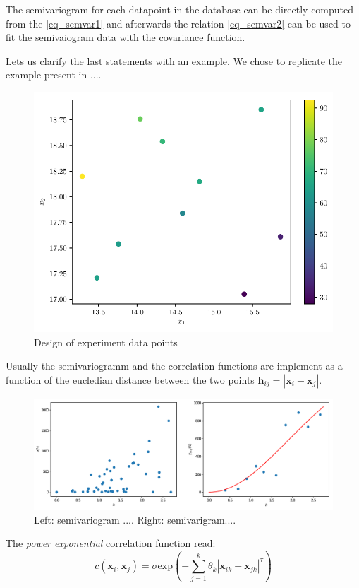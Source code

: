 The semivariogram for each datapoint in the database can be directly computed from the \eqref{eq_semvar1} and afterwards the relation \eqref{eq_semvar2} can be used to fit the semivaiogram data with the covariance function.

Lets us clarify the last statements with an example. We chose to replicate the example present in \citet{cavazzuti2012optimization} ....

\begin{figure}[t]
	\centering
	\includegraphics[width=0.5\linewidth]{appendix_a/DOE_data}
	\caption{Design of experiment data points}
	\label{fig:doedata}
\end{figure}

Usually the semivariogramm and the correlation functions are implement as a function of the eucledian distance between the two points $\mathbf{h}_{ij} = |\mathbf{x}_i - \mathbf{x}_j|$.

\begin{figure}[h]
	\centering
	\includegraphics[width=0.9\linewidth]{appendix_a/sem2}
	\caption{Left: semivariogram ....  Right: semivarigram.... }
	\label{fig:semivariogram}
\end{figure}

The \textit{power exponential} correlation function read:
\begin{equation}
c(\mathbf{x}_{i} , \mathbf{x}_{j})  = \sigma \textrm{exp}\left( -\sum_{j=1}^{k} \theta_k {|\mathbf{x}_{ik} - \mathbf{x}_{jk} |}^\tau \right)
\end{equation}

